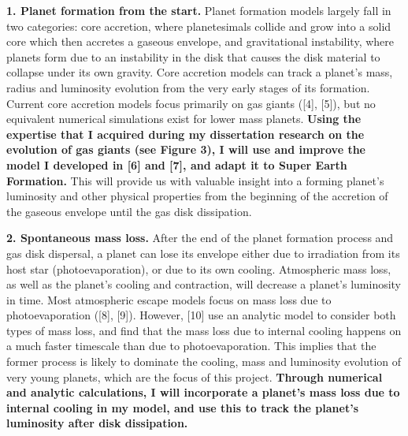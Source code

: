 \documentclass[12pt, letterpaper]{article}
\begin{document}
\vspace{0.2in}

\textbf{1. Planet formation from the start.} Planet formation models largely fall in two categories: core accretion, where planetesimals collide and grow into a solid core which then accretes a gaseous envelope, and gravitational instability, where planets form due to an instability in the disk that causes the disk material to collapse under its own gravity. Core accretion models can track a planet's mass, radius and luminosity evolution from the very early stages of its formation. Current core accretion models focus primarily on gas giants ([4], [5]), but no equivalent numerical simulations exist for lower mass planets. \textbf{Using the expertise that I acquired during my dissertation research on the evolution of gas giants (see Figure 3), I will use and improve the model I developed in [6] and [7], and adapt it to Super Earth Formation.} This will provide us with valuable insight into a forming planet's luminosity and other physical properties from the beginning of the accretion of the gaseous envelope until the gas disk dissipation.  




\vspace{0.2in}
\textbf{2. Spontaneous mass loss.} After the end of the planet formation process and gas disk dispersal, a planet can lose its envelope either due to irradiation from its host star (photoevaporation), or due to its own cooling. Atmospheric mass loss, as well as the planet's cooling and contraction, will decrease a planet's luminosity in time. Most atmospheric escape models focus on mass loss due to photoevaporation ([8], [9]). However, [10] use an analytic model to consider both types of mass loss, and find that the mass loss due to internal cooling happens on a much faster timescale than due to photoevaporation. This implies that the former process is likely to dominate the cooling, mass and luminosity evolution of very young planets, which are the focus of this project. \textbf{Through numerical and analytic calculations, I will incorporate a planet's mass loss due to internal cooling in my model, and use this to track the planet's luminosity after disk dissipation.} 
\end{document}
